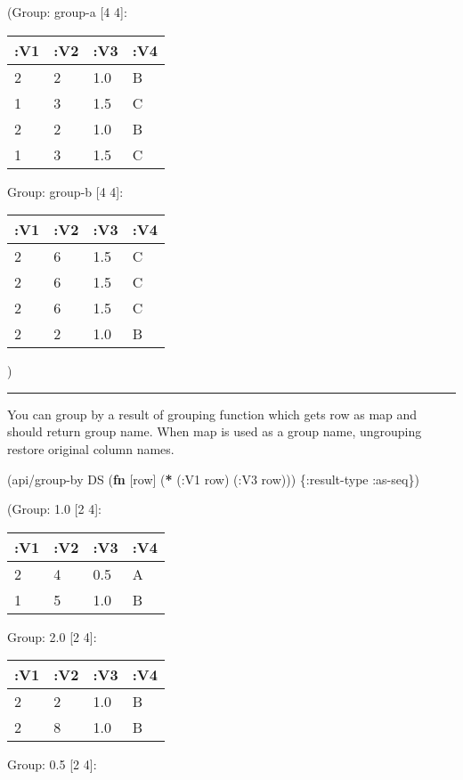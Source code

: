 \documentclass[]{article}
\newenvironment{Shaded}{\begin{snugshade}}{\end{snugshade}}
\newcommand{\AttributeTok}[1]{\textcolor[rgb]{0.77,0.63,0.00}{#1}}
\newcommand{\KeywordTok}[1]{\textcolor[rgb]{0.13,0.29,0.53}{\textbf{#1}}}
\newcommand{\NormalTok}[1]{#1}
\begin{document}
(Group: group-a {[}4 4{]}:

\begin{longtable}[]{@{}llll@{}}
\toprule
:V1 & :V2 & :V3 & :V4\tabularnewline
\midrule
\endhead
2 & 2 & 1.0 & B\tabularnewline
1 & 3 & 1.5 & C\tabularnewline
2 & 2 & 1.0 & B\tabularnewline
1 & 3 & 1.5 & C\tabularnewline
\bottomrule
\end{longtable}

Group: group-b {[}4 4{]}:

\begin{longtable}[]{@{}llll@{}}
\toprule
:V1 & :V2 & :V3 & :V4\tabularnewline
\midrule
\endhead
2 & 6 & 1.5 & C\tabularnewline
2 & 6 & 1.5 & C\tabularnewline
2 & 6 & 1.5 & C\tabularnewline
2 & 2 & 1.0 & B\tabularnewline
\bottomrule
\end{longtable}

)

\begin{center}\rule{0.5\linewidth}{0.5pt}\end{center}

You can group by a result of grouping function which gets row as map and
should return group name. When map is used as a group name, ungrouping
restore original column names.

\begin{Shaded}
\begin{Highlighting}[]
\NormalTok{(api/group-by DS (}\KeywordTok{fn}\NormalTok{ [row] (}\KeywordTok{*}\NormalTok{ (}\AttributeTok{:V1}\NormalTok{ row)}
\NormalTok{                             (}\AttributeTok{:V3}\NormalTok{ row))) \{}\AttributeTok{:result-type} \AttributeTok{:as-seq}\NormalTok{\})}
\end{Highlighting}
\end{Shaded}

(Group: 1.0 {[}2 4{]}:

\begin{longtable}[]{@{}llll@{}}
\toprule
:V1 & :V2 & :V3 & :V4\tabularnewline
\midrule
\endhead
2 & 4 & 0.5 & A\tabularnewline
1 & 5 & 1.0 & B\tabularnewline
\bottomrule
\end{longtable}

Group: 2.0 {[}2 4{]}:

\begin{longtable}[]{@{}llll@{}}
\toprule
:V1 & :V2 & :V3 & :V4\tabularnewline
\midrule
\endhead
2 & 2 & 1.0 & B\tabularnewline
2 & 8 & 1.0 & B\tabularnewline
\bottomrule
\end{longtable}

Group: 0.5 {[}2 4{]}:
\end{document}
